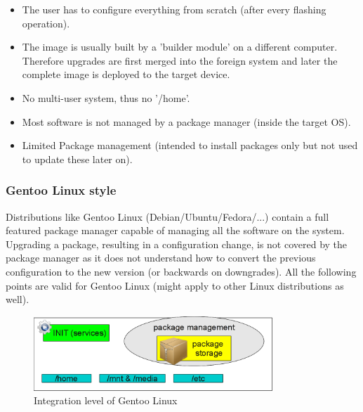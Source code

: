 \documentclass[a4paper,10pt]{article}
\begin{document}
\begin{itemize}
\item The user has to configure everything from scratch (after every flashing operation).
\item The image is usually built by a 'builder module' on a different computer. Therefore upgrades are first merged into the foreign system and later the complete image is deployed to the target device.
\item No multi-user system, thus no '/home'.
\item Most software is not managed by a package manager (inside the target OS).
\item Limited Package management (intended to install packages only but not used to update these later on).
\end{itemize}


\newpage
\subsubsection{Gentoo Linux style}
\label{GentooLinuxstyle}
Distributions like Gentoo Linux (Debian/Ubuntu/Fedora/...) contain a full featured package manager capable of managing all the software on the system. Upgrading a package, resulting in a configuration change, is not covered by the package manager as it does not understand how to convert the previous configuration to the new version (or backwards on downgrades). All the following points are valid for Gentoo Linux (might apply to other Linux distributions as well).

\begin{figure}[h]
\caption[Kurzeintrag]{Integration level of Gentoo Linux}
  \centering
  \includegraphics[width=90mm]{diagrams/package_management_integration3.png}
\end{figure}
\end{document}
